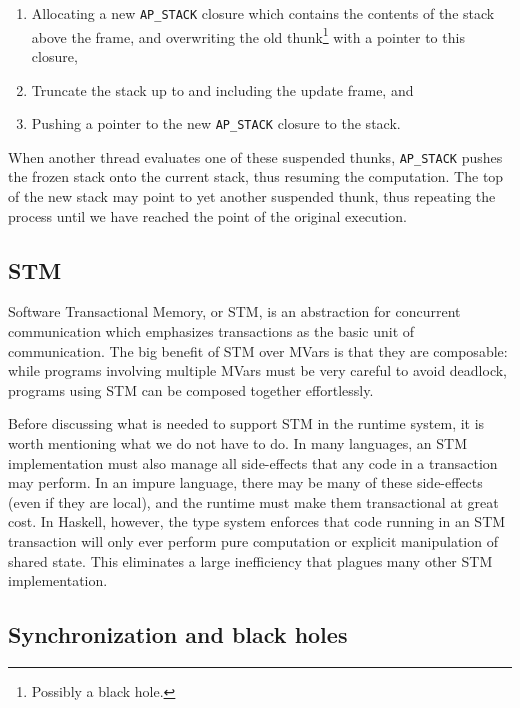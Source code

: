 \begin{enumerate}
    \item Allocating a new \verb|AP_STACK| closure which contains the
        contents of the stack above the frame, and overwriting the
        old thunk\footnote{Possibly a black hole.} with a pointer to this closure,
    \item Truncate the stack up to and including the update frame, and
    \item Pushing a pointer to the new \verb|AP_STACK| closure to the stack.
\end{enumerate}

When another thread evaluates one of these suspended thunks,
\verb|AP_STACK| pushes the frozen stack onto the current stack, thus
resuming the computation.  The top of the new stack may point to
yet another suspended thunk, thus repeating the process until we
have reached the point of the original execution. 

\subsection{STM}

Software Transactional Memory, or STM, is an abstraction for concurrent
communication which emphasizes transactions as the basic unit of
communication.  The big benefit of STM over MVars is that they are
composable: while programs involving multiple MVars must be very careful
to avoid deadlock, programs using STM can be composed together
effortlessly.

Before discussing what is needed to support STM in the runtime system,
it is worth mentioning what we do not have to do.  In many languages,
an STM implementation must also manage all side-effects that any code
in a transaction may perform.  In an impure language, there may be many
of these side-effects (even if they are local), and the runtime must
make them transactional at great cost.  In Haskell, however, the type system
enforces that code running in an STM transaction will only ever perform
pure computation or explicit manipulation of shared state.  This eliminates
a large inefficiency that plagues many other STM implementation.


\subsection{Synchronization and black holes} \label{sec:sync}

